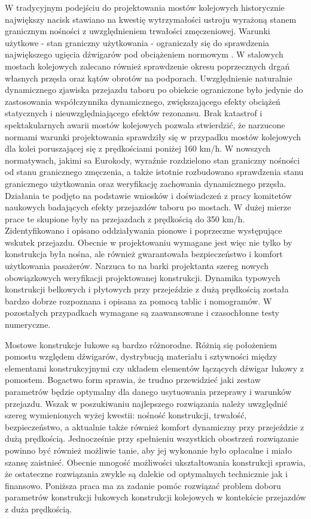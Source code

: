 W tradycyjnym podejściu do projektowania mostów kolejowych historycznie największy nacisk stawiano na kwestię wytrzymałości ustroju wyrażoną stanem granicznym nośności z uwzględnieniem trwałości zmęczeniowej. Warunki użytkowe - stan graniczny użytkowania - ograniczały się do sprawdzenia największego ugięcia dźwigarów pod obciążeniem normowym \parencite{PKNf}. W stalowych mostach kolejowych zalecano również sprawdzenie okresu poprzecznych drgań własnych przęsła oraz kątów obrotów na podporach. Uwzględnienie naturalnie dynamicznego zjawiska przejazdu taboru po obiekcie ograniczone było jedynie do zastosowania współczynnika dynamicznego, zwiększającego efekty obciążeń statycznych i nieuwzględniającego efektów rezonansu. Brak katastrof i spektakularnych awarii mostów kolejowych pozwala stwierdzić, że narzucone normami warunki projektowania sprawdziły się w przypadku mostów kolejowych dla kolei poruszającej się z prędkościami poniżej 160 km/h. W nowszych normatywach, jakimi sa Eurokody, wyraźnie rozdzielono stan graniczny nośności od stanu granicznego zmęczenia, a także istotnie rozbudowano sprawdzenia stanu granicznego użytkowania oraz weryfikację zachowania dynamicznego przęsła. Działania te podjęto na podstawie wniosków i doświadczeń z pracy komitetów naukowych badających efekty przejazdów taboru po mostach. W dużej mierze prace te skupione były na przejazdach z prędkością do 350 km/h. Zidentyfikowano i opisano oddziaływania pionowe i poprzeczne występujące wskutek przejazdu. Obecnie w projektowaniu wymagane jest więc nie tylko by konstrukcja była nośna, ale również gwarantowała bezpieczeństwo i komfort użytkowania pasażerów. Narzuca to na barki projektanta szereg nowych obowiązkowych weryfikacji projektowanej konstrukcji. Dynamika typowych konstrukcji belkowych i płytowych przy przejeździe z dużą prędkością została bardzo dobrze rozpoznana i opisana za pomocą tablic i nomogramów. W pozostałych przypadkach wymagane są zaawansowane i czasochłonne testy numeryczne. 

Mostowe konstrukcje łukowe są bardzo różnorodne. Różnią się położeniem pomostu względem dźwigarów, dystrybucją materiału i sztywności między elementami konstrukcyjnymi czy układem elementów łączących dźwigar łukowy z pomostem. Bogactwo form sprawia, że trudno przewidzieć jaki zestaw parametrów będzie optymalny dla danego usytuowania przeprawy i warunków przejazdu. Wszak w poszukiwaniu najlepszego rozwiązania należy uwzględnić szereg wymienionych wyżej kwestii: nośność konstrukcji, trwałość, bezpieczeństwo, a aktualnie także również komfort dynamiczny przy przejeździe z dużą prędkością. Jednocześnie przy spełnieniu wszystkich obostrzeń rozwiązanie powinno być również możliwie tanie, aby jej wykonanie było opłacalne i miało szansę zaistnieć. Obecnie mnogość możliwości ukształtowania konstrukcji sprawia, że ostateczne rozwiązania zwykle są dalekie od optymalnych technicznie jak i finansowo. Poniższa praca ma za zadanie pomóc rozwiązać problem doboru parametrów konstrukcji łukowych konstrukcji kolejowych w kontekście przejazdów z duża prędkością.


